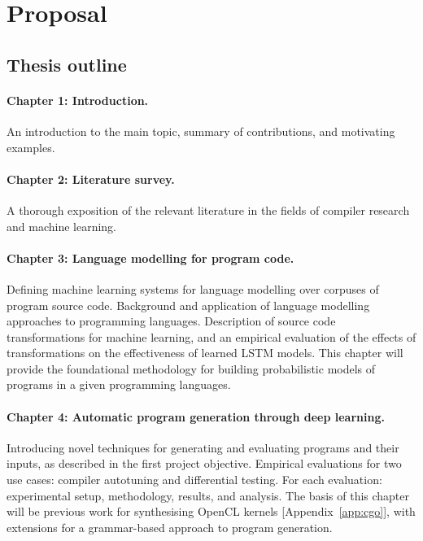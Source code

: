 \newpage
\section{Proposal}


\subsection{Thesis outline}

\paragraph{Chapter 1: Introduction.} An introduction to the main topic, summary of contributions, and motivating examples.

\paragraph{Chapter 2: Literature survey.} A thorough exposition of the relevant literature in the fields of compiler research and machine learning.

\paragraph{Chapter 3: Language modelling for program code.} Defining machine learning systems for language modelling over corpuses of program source code. Background and application of language modelling approaches to programming languages. Description of source code transformations for machine learning, and an empirical evaluation of the effects of transformations on the effectiveness of learned LSTM models. This chapter will provide the foundational methodology for building probabilistic models of programs in a given programming languages.

\paragraph{Chapter 4: Automatic program generation through deep learning.}  Introducing novel techniques for generating and evaluating programs and their inputs, as described in the first project objective. Empirical evaluations for two use cases: compiler autotuning and differential testing. For each evaluation: experimental setup, methodology, results, and analysis. The basis of this chapter will be previous work for synthesising OpenCL kernels [Appendix~\ref{app:cgo}], with extensions for a grammar-based approach to program generation.

